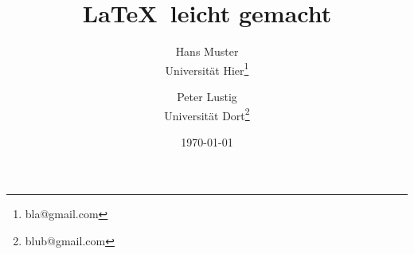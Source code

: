 \documentclass[10pt, a4paper]{article}
\begin{document}
\title{\LaTeX\ leicht gemacht}

\author{Hans Muster\\Universität Hier\thanks{bla@gmail.com} \and Peter Lustig\\Universität Dort\thanks{blub@gmail.com}}

\date{\today}

\maketitle


\newpage

\blindtext
\end{document}
